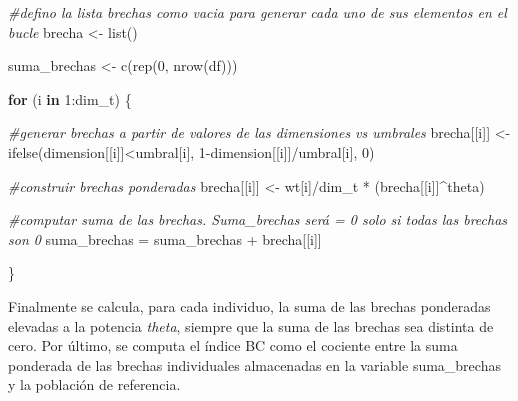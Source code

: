 \documentclass[
]{book}
\newenvironment{Shaded}{\begin{snugshade}}{\end{snugshade}}
\newcommand{\AttributeTok}[1]{\textcolor[rgb]{0.77,0.63,0.00}{#1}}
\newcommand{\CommentTok}[1]{\textcolor[rgb]{0.56,0.35,0.01}{\textit{#1}}}
\newcommand{\ControlFlowTok}[1]{\textcolor[rgb]{0.13,0.29,0.53}{\textbf{#1}}}
\newcommand{\DecValTok}[1]{\textcolor[rgb]{0.00,0.00,0.81}{#1}}
\newcommand{\FunctionTok}[1]{\textcolor[rgb]{0.00,0.00,0.00}{#1}}
\newcommand{\NormalTok}[1]{#1}
\newcommand{\OtherTok}[1]{\textcolor[rgb]{0.56,0.35,0.01}{#1}}
\newcommand{\SpecialCharTok}[1]{\textcolor[rgb]{0.00,0.00,0.00}{#1}}
\newcommand{\StringTok}[1]{\textcolor[rgb]{0.31,0.60,0.02}{#1}}
\begin{document}
\begin{Shaded}
\begin{Highlighting}[]
\CommentTok{\#defino la lista brechas como vacia para generar cada uno de sus elementos en el bucle}
\NormalTok{brecha }\OtherTok{\textless{}{-}} \FunctionTok{list}\NormalTok{()}

\NormalTok{suma\_brechas }\OtherTok{\textless{}{-}} \FunctionTok{c}\NormalTok{(}\FunctionTok{rep}\NormalTok{(}\DecValTok{0}\NormalTok{, }\FunctionTok{nrow}\NormalTok{(df)))}

\ControlFlowTok{for}\NormalTok{ (i }\ControlFlowTok{in} \DecValTok{1}\SpecialCharTok{:}\NormalTok{dim\_t) \{}
  
  \CommentTok{\#generar brechas a partir de valores de las dimensiones vs umbrales}
\NormalTok{  brecha[[i]] }\OtherTok{\textless{}{-}} \FunctionTok{ifelse}\NormalTok{(dimension[[i]]}\SpecialCharTok{\textless{}}\NormalTok{umbral[i], }\DecValTok{1}\SpecialCharTok{{-}}\NormalTok{dimension[[i]]}\SpecialCharTok{/}\NormalTok{umbral[i], }\DecValTok{0}\NormalTok{)}
  
  \CommentTok{\#construir brechas ponderadas}
\NormalTok{  brecha[[i]] }\OtherTok{\textless{}{-}}\NormalTok{ wt[i]}\SpecialCharTok{/}\NormalTok{dim\_t }\SpecialCharTok{*}\NormalTok{ (brecha[[i]]}\SpecialCharTok{\^{}}\NormalTok{theta)}
  
  \CommentTok{\#computar suma de las brechas. Suma\_brechas será = 0 solo si todas las brechas son 0}
\NormalTok{  suma\_brechas }\OtherTok{=}\NormalTok{ suma\_brechas }\SpecialCharTok{+}\NormalTok{ brecha[[i]]}
  
\NormalTok{\}}
\end{Highlighting}
\end{Shaded}

Finalmente se calcula, para cada individuo, la suma de las brechas ponderadas elevadas a la potencia \emph{theta}, siempre que la suma de las brechas sea distinta de cero. Por último, se computa el índice BC como el cociente entre la suma ponderada de las brechas individuales almacenadas en la variable suma\_brechas y la población de referencia.

\begin{Shaded}
\end{Shaded}
\end{document}
